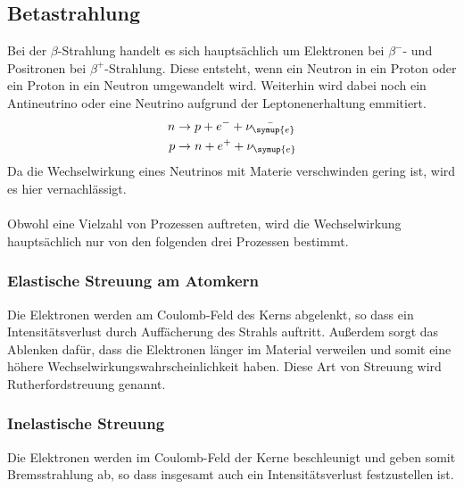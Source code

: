 \subsection{Betastrahlung}
\label{sec:Betastrahlung}
Bei der $\beta$-Strahlung handelt es sich hauptsächlich um Elektronen bei $\beta^{-}$- und Positronen bei
$\beta^{+}$-Strahlung. Diese entsteht, wenn ein Neutron in ein Proton oder ein Proton in ein Neutron umgewandelt
wird. Weiterhin wird dabei noch ein Antineutrino oder eine Neutrino aufgrund der Leptonenerhaltung emmitiert.
\begin{align*}
    n &\rightarrow p + e^{-} + \bar{\nu_{\symup{e}}}\\
    p &\rightarrow n + e^{+} + \nu_{\symup{e}}
\end{align*}
Da die Wechselwirkung eines Neutrinos mit Materie verschwinden gering ist, wird es hier vernachlässigt.\\
\\
Obwohl eine Vielzahl von Prozessen auftreten, wird die Wechselwirkung hauptsächlich nur von den folgenden
drei Prozessen bestimmt.

\subsubsection{Elastische Streuung am Atomkern}
\label{sec:elastischeStreuung}
Die Elektronen werden am Coulomb-Feld des Kerns abgelenkt, so dass ein Intensitätsverlust durch Auffächerung des Strahls
auftritt. Außerdem sorgt das Ablenken dafür, dass die Elektronen länger im Material verweilen und somit eine
höhere Wechselwirkungswahrscheinlichkeit haben. Diese Art von Streuung wird Rutherfordstreuung genannt.

\subsubsection{Inelastische Streuung}
\label{sec:inelastischeStreuung}
Die Elektronen werden im Coulomb-Feld der Kerne beschleunigt und geben somit Bremsstrahlung ab, so dass insgesamt
auch ein Intensitätsverlust festzustellen ist.

